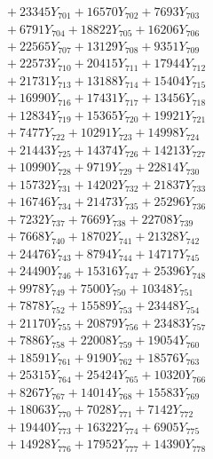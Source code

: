 \documentclass[a4paper,10pt]{article}
\begin{document}
{\begin{align}
&\;  + 23345 Y_{701} + 16570 Y_{702} + 7693 Y_{703} \\[0.3ex]
&\;  + 6791 Y_{704} + 18822 Y_{705} + 16206 Y_{706} \\[0.3ex]
&\;  + 22565 Y_{707} + 13129 Y_{708} + 9351 Y_{709} \\[0.3ex]
&\;  + 22573 Y_{710} + 20415 Y_{711} + 17944 Y_{712} \\[0.3ex]
&\;  + 21731 Y_{713} + 13188 Y_{714} + 15404 Y_{715} \\[0.3ex]
&\;  + 16990 Y_{716} + 17431 Y_{717} + 13456 Y_{718} \\[0.5ex]\allowbreak
&\;  + 12834 Y_{719} + 15365 Y_{720} + 19921 Y_{721} \\[0.3ex]
&\;  + 7477 Y_{722} + 10291 Y_{723} + 14998 Y_{724} \\[0.3ex]
&\;  + 21443 Y_{725} + 14374 Y_{726} + 14213 Y_{727} \\[0.3ex]
&\;  + 10990 Y_{728} + 9719 Y_{729} + 22814 Y_{730} \\[0.3ex]
&\;  + 15732 Y_{731} + 14202 Y_{732} + 21837 Y_{733} \\[0.3ex]
&\;  + 16746 Y_{734} + 21473 Y_{735} + 25296 Y_{736} \\[0.3ex]
&\;  + 7232 Y_{737} + 7669 Y_{738} + 22708 Y_{739} \\[0.3ex]
&\;  + 7668 Y_{740} + 18702 Y_{741} + 21328 Y_{742} \\[0.3ex]
&\;  + 24476 Y_{743} + 8794 Y_{744} + 14717 Y_{745} \\[0.3ex]
&\;  + 24490 Y_{746} + 15316 Y_{747} + 25396 Y_{748} \\[0.5ex]\allowbreak
&\;  + 9978 Y_{749} + 7500 Y_{750} + 10348 Y_{751} \\[0.3ex]
&\;  + 7878 Y_{752} + 15589 Y_{753} + 23448 Y_{754} \\[0.3ex]
&\;  + 21170 Y_{755} + 20879 Y_{756} + 23483 Y_{757} \\[0.3ex]
&\;  + 7886 Y_{758} + 22008 Y_{759} + 19054 Y_{760} \\[0.3ex]
&\;  + 18591 Y_{761} + 9190 Y_{762} + 18576 Y_{763} \\[0.3ex]
&\;  + 25315 Y_{764} + 25424 Y_{765} + 10320 Y_{766} \\[0.3ex]
&\;  + 8267 Y_{767} + 14014 Y_{768} + 15583 Y_{769} \\[0.3ex]
&\;  + 18063 Y_{770} + 7028 Y_{771} + 7142 Y_{772} \\[0.3ex]
&\;  + 19440 Y_{773} + 16322 Y_{774} + 6905 Y_{775} \\[0.3ex]
&\;  + 14928 Y_{776} + 17952 Y_{777} + 14390 Y_{778} \\[0.5ex]\allowbreak

\end{align}}
\end{document}
